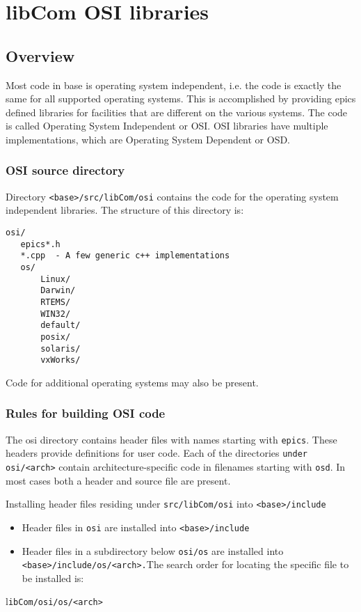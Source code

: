 





\chapter{libCom OSI libraries}

\section{Overview}

Most code in base is operating system independent, i.e. the code is exactly the same for all supported operating systems. 
This is accomplished by providing epics defined libraries for facilities that are different on the various systems. The code 
is called Operating System Independent or OSI. OSI libraries have multiple implementations, which are Operating 
System Dependent or OSD.

\subsection{OSI source directory}

Directory \verb|<base>/src/libCom/osi| contains the code for the operating system independent libraries. The structure 
of this directory is:

\begin{verbatim}osi/
   epics*.h
   *.cpp  - A few generic c++ implementations
   os/
       Linux/
       Darwin/
       RTEMS/
       WIN32/
       default/
       posix/
       solaris/
       vxWorks/
\end{verbatim}Code for additional operating systems may also be present.

\subsection{Rules for building OSI code}

The osi directory contains header files with names starting with \verb|epics|. These headers provide definitions for user code. 
Each of the directories \verb|under| \verb|osi/<arch>| contain architecture-specific code in filenames starting with \verb|osd|. In most 
cases both a header and source file are present.

Installing header files residing under \verb|src/libCom/osi| into \verb|<base>/include|

\begin{itemize}\item Header files in \verb|osi| are installed into \verb|<base>/include|

\item Header files in a subdirectory below \verb|osi/os| are installed into \verb|<base>/include/os/<arch>.|The search 
order for locating the specific file to be installed is:

\end{itemize} l\verb|ibCom/osi/os/<arch>|

